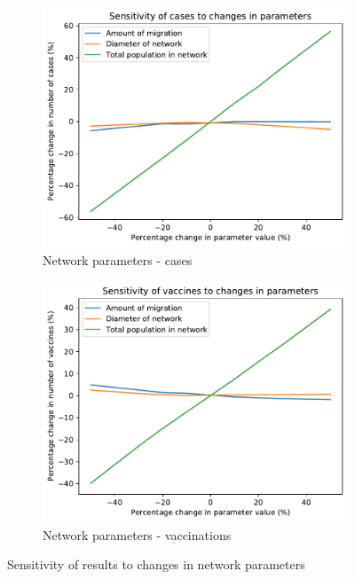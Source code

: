 \documentclass[10pt,letterpaper]{article}
\begin{document}
\begin{figure}[ht!]
  \begin{subfigure}[b]{0.5\textwidth}
    \includegraphics[width=\textwidth]{figures/sensitivity/network_param_cases.pdf}
    \caption{Network parameters - cases}
    \label{fig:sens_network_cases}
  \end{subfigure}
  \begin{subfigure}[b]{0.5\textwidth}
    \includegraphics[width=\textwidth]{figures/sensitivity/network_param_vaccines.pdf}
    \caption{Network parameters - vaccinations}
    \label{fig:sens_network_vaccs}
  \end{subfigure}
  \caption{Sensitivity of results to changes in network parameters}
\end{figure}
\end{document}
